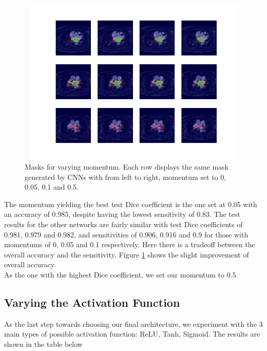 \begin{figure}
\centering
\includegraphics[trim=2.5cm 1.5cm 2cm 1.5cm, clip=true, height=80mm, width=150mm]{Chapter3/mask_results_varying_momentum.png}
\caption{Masks for varying momentum. Each row displays the same mask generated by CNNs with from left to right, momentum set to 0, 0.05, 0.1 and 0.5.}
\label{mask_results_momentum}
\end{figure}

\noindent The momentum yielding the best test Dice coefficient is the one set at 0.05 with an accuracy of 0.985, despite having the lowest sensitivity of 0.83. The test results for the other networks are fairly similar with test Dice coefficients of 0.981, 0.979 and 0.982, and sensitivities of 0.906, 0.916 and 0.9 for those with momentums of 0, 0.05 and 0.1 respectively. Here there is a tradeoff between the overall accuracy and the sensitivity. Figure \ref{mask_results_momentum} shows the slight improvement of overall accuracy.\\

\noindent As the one with the highest Dice coefficient, we set our momentum to 0.5.

\subsection{Varying the Activation Function}

\noindent As the last step towards choosing our final architecture, we experiment with the 3 main types of possible activation function: ReLU, Tanh, Sigmoid. The results are shown in the table below\\

